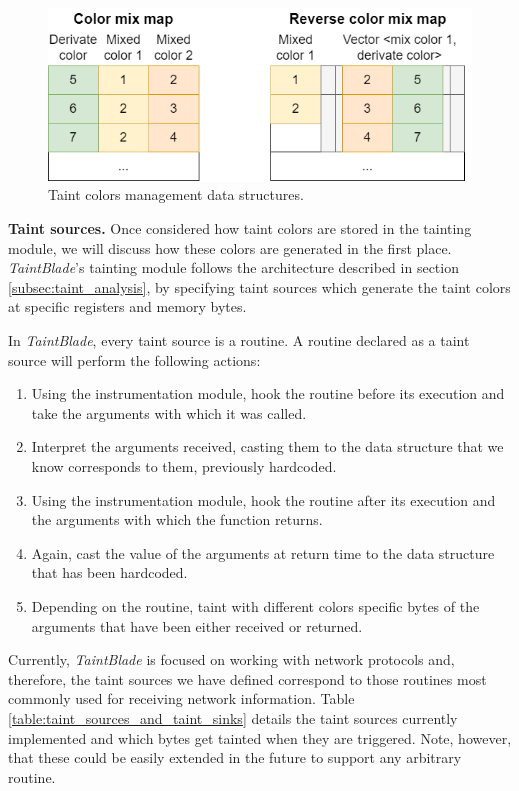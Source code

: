 \documentclass[conference]{IEEEtran}
\begin{document}
\begin{figure}
    \centerline{\includegraphics[width=0.9\columnwidth]{images/colormixtaintarch.drawio.png}}
    \caption{Taint colors management data structures.}
    \label{figure:colormixtaintarch}
\end{figure}

\textbf{Taint sources.} Once considered how taint colors are stored in the tainting
module, we will discuss how these colors are generated in the first place. \textit{TaintBlade}'s
tainting module follows the architecture described in section \ref{subsec:taint_analysis}, by specifying taint sources
which generate the taint colors at specific registers and memory bytes.

In \textit{TaintBlade}, every taint source is a routine. A routine declared as
a taint source will perform the following actions:
\begin{enumerate}
    \item Using the instrumentation module, hook the routine before its execution and
          take the arguments with which it was called.
    \item Interpret the arguments received, casting them to the data structure that we
          know corresponds to them, previously hardcoded.
    \item Using the instrumentation module, hook the routine after its execution and the
          arguments with which the function returns.
    \item Again, cast the value of the arguments at return time to the data structure
          that has been hardcoded.
    \item Depending on the routine, taint with different colors specific bytes of the
          arguments that have been either received or returned.
\end{enumerate}

Currently, \textit{TaintBlade} is focused on working with network protocols
and, therefore, the taint sources we have defined correspond to those routines
most commonly used for receiving network information. Table
\ref{table:taint_sources_and_taint_sinks} details the taint sources currently
implemented and which bytes get tainted when they are triggered. Note, however,
that these could be easily extended in the future to support any arbitrary
routine.
\end{document}
